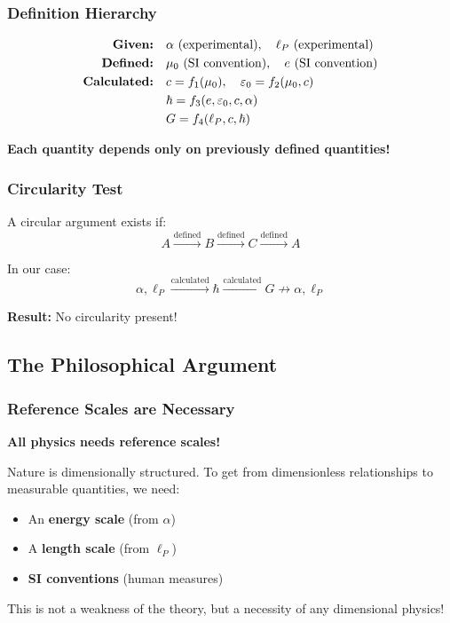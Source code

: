 	\subsubsection{Definition Hierarchy}
	
	\begin{align}
		\text{\textbf{Given:}} &\quad \alpha \text{ (experimental)}, \quad \ell_P \text{ (experimental)}\\
		\text{\textbf{Defined:}} &\quad \mu_0 \text{ (SI convention)}, \quad e \text{ (SI convention)}\\
		\text{\textbf{Calculated:}} &\quad c = f_1(\mu_0), \quad \varepsilon_0 = f_2(\mu_0, c)\\
		&\quad \hbar = f_3(e, \varepsilon_0, c, \alpha)\\
		&\quad G = f_4(\ell_P, c, \hbar)
	\end{align}
	
	\textbf{Each quantity depends only on previously defined quantities!}
	
	\subsubsection{Circularity Test}
	
	A circular argument exists if:
	\begin{equation}
		A \xrightarrow{\text{defined}} B \xrightarrow{\text{defined}} C \xrightarrow{\text{defined}} A
	\end{equation}
	
	In our case:
	\begin{equation}
		\alpha, \ell_P \xrightarrow{\text{calculated}} \hbar \xrightarrow{\text{calculated}} G \not\rightarrow \alpha, \ell_P
	\end{equation}
	
	\textbf{Result:} No circularity present!
	
	\subsection{The Philosophical Argument}
	
	\subsubsection{Reference Scales are Necessary}
	
	\begin{tcolorbox}[colback=blue!5!white,colframe=blue!75!black,title=Fundamental Insight]
		\textbf{All physics needs reference scales!}
		
		Nature is dimensionally structured. To get from dimensionless relationships to measurable quantities, we need:
		\begin{itemize}
			\item An \textbf{energy scale} (from $\alpha$)
			\item A \textbf{length scale} (from $\ell_P$) 
			\item \textbf{SI conventions} (human measures)
		\end{itemize}
		
		This is not a weakness of the theory, but a necessity of any dimensional physics!
	\end{tcolorbox}
	
